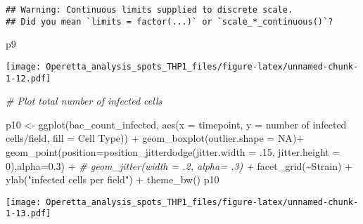 \documentclass[
]{article}
\newenvironment{Shaded}{\begin{snugshade}}{\end{snugshade}}
\newcommand{\AttributeTok}[1]{\textcolor[rgb]{0.77,0.63,0.00}{#1}}
\newcommand{\CommentTok}[1]{\textcolor[rgb]{0.56,0.35,0.01}{\textit{#1}}}
\newcommand{\ConstantTok}[1]{\textcolor[rgb]{0.00,0.00,0.00}{#1}}
\newcommand{\DecValTok}[1]{\textcolor[rgb]{0.00,0.00,0.81}{#1}}
\newcommand{\FloatTok}[1]{\textcolor[rgb]{0.00,0.00,0.81}{#1}}
\newcommand{\FunctionTok}[1]{\textcolor[rgb]{0.00,0.00,0.00}{#1}}
\newcommand{\NormalTok}[1]{#1}
\newcommand{\OtherTok}[1]{\textcolor[rgb]{0.56,0.35,0.01}{#1}}
\newcommand{\SpecialCharTok}[1]{\textcolor[rgb]{0.00,0.00,0.00}{#1}}
\newcommand{\StringTok}[1]{\textcolor[rgb]{0.31,0.60,0.02}{#1}}
\begin{document}
\begin{verbatim}
## Warning: Continuous limits supplied to discrete scale.
## Did you mean `limits = factor(...)` or `scale_*_continuous()`?
\end{verbatim}

\begin{Shaded}
\begin{Highlighting}[]
\NormalTok{p9}
\end{Highlighting}
\end{Shaded}

\texttt{[image: Operetta\_analysis\_spots\_THP1\_files/figure-latex/unnamed-chunk-1-12.pdf]}

\begin{Shaded}
\begin{Highlighting}[]
\CommentTok{\# Plot total number of infected cells}

\NormalTok{p10 }\OtherTok{\textless{}{-}} \FunctionTok{ggplot}\NormalTok{(bac\_count\_infected, }\FunctionTok{aes}\NormalTok{(}\AttributeTok{x =}\NormalTok{ timepoint, }\AttributeTok{y =} \StringTok{\textasciigrave{}}\AttributeTok{number of infected cells/field}\StringTok{\textasciigrave{}}\NormalTok{, }\AttributeTok{fill =} \StringTok{\textasciigrave{}}\AttributeTok{Cell Type}\StringTok{\textasciigrave{}}\NormalTok{)) }\SpecialCharTok{+}
  \FunctionTok{geom\_boxplot}\NormalTok{(}\AttributeTok{outlier.shape =} \ConstantTok{NA}\NormalTok{)}\SpecialCharTok{+}
  \FunctionTok{geom\_point}\NormalTok{(}\AttributeTok{position=}\FunctionTok{position\_jitterdodge}\NormalTok{(}\AttributeTok{jitter.width =}\NormalTok{ .}\DecValTok{15}\NormalTok{, }\AttributeTok{jitter.height =} \DecValTok{0}\NormalTok{),}\AttributeTok{alpha=}\FloatTok{0.3}\NormalTok{) }\SpecialCharTok{+}
  \CommentTok{\#  geom\_jitter(width = .2, alpha= .3) +}
  \FunctionTok{facet\_grid}\NormalTok{(}\SpecialCharTok{\textasciitilde{}}\NormalTok{Strain) }\SpecialCharTok{+}
  \FunctionTok{ylab}\NormalTok{(}\StringTok{"infected cells per field"}\NormalTok{) }\SpecialCharTok{+}
  \FunctionTok{theme\_bw}\NormalTok{()}
\NormalTok{p10}
\end{Highlighting}
\end{Shaded}

\texttt{[image: Operetta\_analysis\_spots\_THP1\_files/figure-latex/unnamed-chunk-1-13.pdf]}
\end{document}
